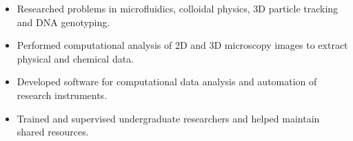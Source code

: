 \documentclass[10pt]{article}
\begin{document}
\begin{itemize}\setlength{\itemsep}{0cm}
  \setlength{\parskip}{0cm}

\item Researched problems in microfluidics, colloidal physics, 3D particle tracking and DNA genotyping.

\item Performed computational analysis of 2D and 3D microscopy images to extract physical and chemical data.





\item Developed software for computational data analysis and automation of research instruments.

\item Trained and supervised undergraduate researchers and helped maintain shared resources. 







\end{itemize}
\end{document}
